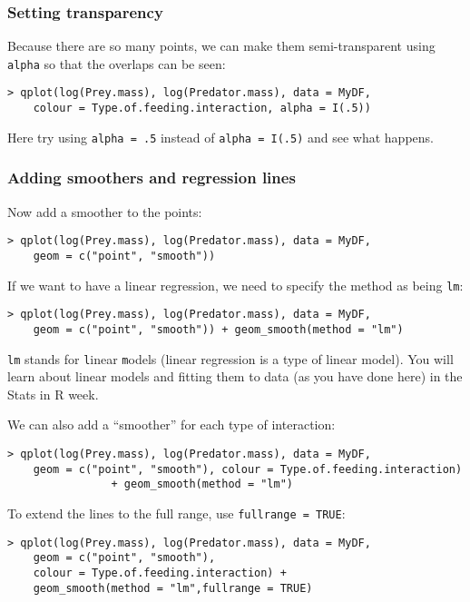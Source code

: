 \subsubsection{Setting transparency}
Because there are so many points, we can make them semi-transparent 
using {\tt alpha} so that the overlaps can be seen:
\begin{lstlisting}
> qplot(log(Prey.mass), log(Predator.mass), data = MyDF, 
	colour = Type.of.feeding.interaction, alpha = I(.5))
\end{lstlisting}
Here try using {\tt alpha = .5} instead of {\tt alpha = I(.5)} and see 
what happens.

\subsubsection{Adding smoothers and regression lines}

Now add a smoother to the points: 
\begin{lstlisting}
> qplot(log(Prey.mass), log(Predator.mass), data = MyDF, 
	geom = c("point", "smooth"))
\end{lstlisting}

If we want to have a linear regression, we need to specify the method 
as being {\tt lm}:

\begin{lstlisting}
> qplot(log(Prey.mass), log(Predator.mass), data = MyDF, 
	geom = c("point", "smooth")) + geom_smooth(method = "lm")
\end{lstlisting}

{\tt lm} stands for {\tt l}inear {\tt m}odels (linear regression is a type 
of linear model). You will learn about linear models and fitting them 
to data (as you have done here) in the Stats in R week. 

We can also add a ``smoother'' for each type of interaction:
\begin{lstlisting}
> qplot(log(Prey.mass), log(Predator.mass), data = MyDF, 
	geom = c("point", "smooth"), colour = Type.of.feeding.interaction)  
				+ geom_smooth(method = "lm")
\end{lstlisting}

To extend the lines to the full range, use {\tt fullrange = TRUE}:

\begin{lstlisting}
> qplot(log(Prey.mass), log(Predator.mass), data = MyDF, 
	geom = c("point", "smooth"),
	colour = Type.of.feeding.interaction) + 
	geom_smooth(method = "lm",fullrange = TRUE)
\end{lstlisting}

